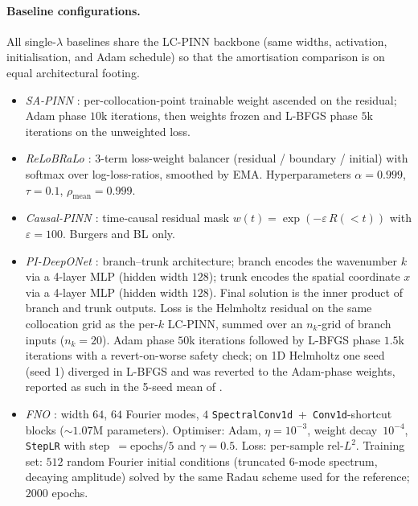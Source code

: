 \paragraph{Baseline configurations.}
All single-$\lambda$ baselines share the LC-PINN backbone (same
widths, activation, initialisation, and Adam schedule) so that the
amortisation comparison is on equal architectural footing.

\begin{itemize}\setlength{\itemsep}{0pt}
\item \emph{SA-PINN \citep{mcclenny2020}}: per-collocation-point
      trainable weight ascended on the residual; Adam phase
      $10\text{k}$ iterations, then weights frozen and L-BFGS phase
      $5\text{k}$ iterations on the unweighted loss.
\item \emph{ReLoBRaLo \citep{bischof2021}}: 3-term loss-weight
      balancer (residual / boundary / initial) with softmax over
      log-loss-ratios, smoothed by EMA. Hyperparameters
      $\alpha\!=\!0.999$, $\tau\!=\!0.1$,
      $\rho_{\text{mean}}\!=\!0.999$.
\item \emph{Causal-PINN \citep{wang2024}}: time-causal residual mask
      $w(t)\!=\!\exp\!\left(-\varepsilon\,R(<\!t)\right)$ with
      $\varepsilon\!=\!100$. Burgers and BL only.
\item \emph{PI-DeepONet \citep{wang2021pi-deeponet}}: branch--trunk
      architecture; branch encodes the wavenumber $k$ via a 4-layer
      MLP (hidden width $128$); trunk encodes the spatial coordinate
      $x$ via a 4-layer MLP (hidden width $128$). Final solution is
      the inner product of branch and trunk outputs. Loss is the
      Helmholtz residual on the same collocation grid as the per-$k$
      LC-PINN, summed over an $n_k$-grid of branch inputs ($n_k\!=\!20$).
      Adam phase $50$k iterations followed by L-BFGS phase $1.5$k
      iterations with a revert-on-worse safety check; on 1D Helmholtz
      one seed (seed 1) diverged in L-BFGS and was reverted to the
      Adam-phase weights, reported as such in the 5-seed mean of
      .
\item \emph{FNO \citep{li2020fno}}: width $64$, $64$ Fourier modes,
      $4$ \texttt{SpectralConv1d}~+~\texttt{Conv1d}-shortcut blocks
      ($\sim\!1.07$M parameters). Optimiser: Adam,
      $\eta\!=\!10^{-3}$, weight decay~$10^{-4}$, \texttt{StepLR}
      with step~$=\!\text{epochs}/5$ and $\gamma\!=\!0.5$. Loss:
      per-sample rel-$L^2$. Training set: $512$ random Fourier
      initial conditions (truncated 6-mode spectrum, decaying
      amplitude) solved by the same Radau scheme used for the
      reference; $2000$ epochs.
\end{itemize}

